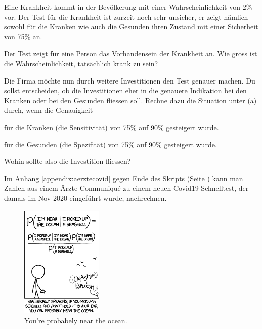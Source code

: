 \documentclass[%
11pt,%
twoside,%
titlepage,%
german,%
headsepline%
]{scrartcl}
\begin{document}
\begin{ueb}
Eine Krankheit kommt in der Bevölkerung mit einer Wahrscheinlichkeit von $2\%$ vor. Der Test für die Krankheit ist zurzeit noch sehr unsicher, er zeigt nämlich sowohl für die Kranken wie auch die Gesunden ihren Zustand mit einer Sicherheit von 75\% an.

\begin{enumeratea}
\item Der Test zeigt für eine Person das Vorhandensein der Krankheit an. Wie gross ist die
Wahrscheinlichkeit, tatsächlich krank zu sein?
\item Die Firma möchte nun durch weitere Investitionen den Test genauer machen. Du
sollst entscheiden, ob die Investitionen eher in die genauere Indikation bei den
Kranken oder bei den Gesunden fliessen soll. Rechne dazu die Situation unter (a) durch, wenn die Genauigkeit
\begin{enumeratei}
\item für die Kranken (die Sensitivität) von 75\% auf 90\% gesteigert wurde.
\item für die Gesunden (die Spezifität) von 75\% auf 90\% gesteigert wurde.
\end{enumeratei}
Wohin sollte also die Investition fliessen?
\end{enumeratea}
\end{ueb}

Im Anhang \ref{appendix:aerztecovid} gegen Ende des Skripts (Seite \pageref{appendix:aerztecovid}) kann man Zahlen aus einem Ärzte-Communiqué zu einem neuen Covid19 Schnelltest, der damals im Nov 2020 eingeführt wurde, nachrechnen.

\begin{figure}
    \centering
    \includegraphics[width=0.35\textwidth]{pictures/bedingtewkeit.png}
    \caption{You're probabely near the ocean.}
\end{figure}
\end{document}
